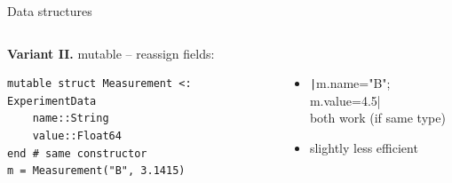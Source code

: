 \documentclass[aspectratio=169, 12pt]{beamer}
\begin{document}
\begin{frame}[fragile]{Data structures}
\begin{columns}[T]
\begin{column}{.48\textwidth}
\begin{itemize}[<+->]
                \end{itemize}
            \end{column}
        \end{columns}
        \pause
        \vspace{1\baselineskip}
        \begin{columns}[T]
            \begin{column}{.51\textwidth}
                \textbf{Variant II.} mutable – reassign fields:
                \begin{verbatim}
mutable struct Measurement <: ExperimentData
    name::String
    value::Float64
end # same constructor
m = Measurement("B", 3.1415)
                \end{verbatim}
            \end{column}
            \begin{column}{.48\textwidth}
                \pause
                \ \\[1.5\baselineskip]
                \begin{itemize}[<+->]
                    \item \texttt|m.name="B"; m.value=4.5|\\
                    both work (if same type)
                    \item slightly less efficient
                \end{itemize}
            \end{column}
        \end{columns}
    \end{frame}
\end{document}
